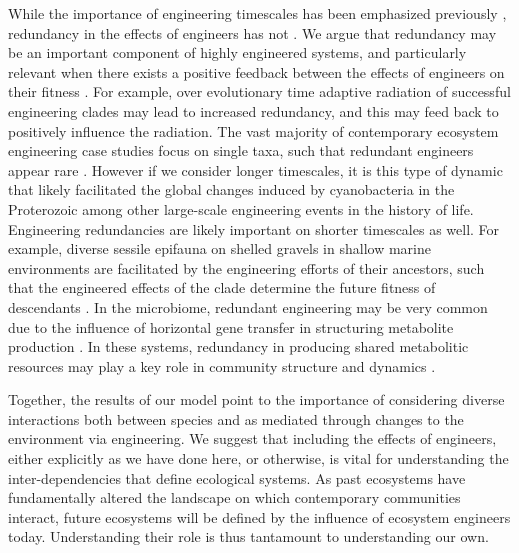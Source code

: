 \documentclass[9pt,twocolumn,twoside]{pnas-new}
\begin{document}
While the importance of engineering timescales has been emphasized previously \cite{Hastings2007}, redundancy in the effects of engineers has not \cite{Lawton1994}.
We argue that redundancy may be an important component of highly engineered systems, and particularly relevant when there exists a positive feedback between the effects of engineers on their fitness \cite{Cuddington2004}.
For example, over evolutionary time adaptive radiation of successful engineering clades may lead to increased redundancy, and this may feed back to positively influence the radiation.
The vast majority of contemporary ecosystem engineering case studies focus on single taxa, such that redundant engineers appear rare \cite{Lawton1994}.
However if we consider longer timescales, it is this type of dynamic that likely facilitated the global changes induced by cyanobacteria in the Proterozoic \cite{Schirrmeister2013} among other large-scale engineering events in the history of life.
Engineering redundancies are likely important on shorter timescales as well.
For example, diverse sessile epifauna on shelled gravels in shallow marine environments are facilitated by the engineering efforts of their ancestors, such that the engineered effects of the clade determine the future fitness of descendants \cite{Kidwell1986}.
In the microbiome, redundant engineering may be very common due to the influence of horizontal gene transfer in structuring metabolite production \cite{Polz2013}.
In these systems, redundancy in producing shared metabolitic resources may play a key role in community structure and dynamics \cite{Kallus2017,Muscarella2017}.



Together, the results of our model point to the importance of considering diverse interactions both between species and as mediated through changes to the environment via engineering.
We suggest that including the effects of engineers, either explicitly as we have done here, or otherwise, is vital for understanding the inter-dependencies that define ecological systems.
As past ecosystems have fundamentally altered the landscape on which contemporary communities interact, future ecosystems will be defined by the influence of ecosystem engineers today.
Understanding their role is thus tantamount to understanding our own.\\


\end{document}

